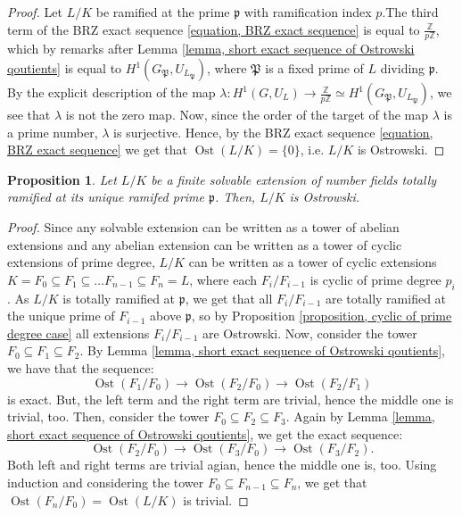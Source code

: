 \documentclass{amsart}
\newtheorem{proposition}[theorem]{Proposition}
\theoremstyle{definition}
\numberwithin{equation}{section}
\DeclareMathOperator{\Ost}{Ost}
\begin{document}
\begin{proof}
Let $L/K$ be ramified at the prime $\mathfrak{p}$ with ramification index $p$.The third term of the BRZ exact sequence \eqref{equation, BRZ exact sequence} is 
equal to $\frac{\mathbb{Z}}{p\mathbb{Z}}$, which by remarks after Lemma \ref{lemma, short exact sequence of Ostrowski qoutients} is equal to $ H^1(G_{\mathfrak{P}},U_{L_{\mathfrak{P}}})$, where $\mathfrak{P}$ is a fixed prime of $L$ dividing $\mathfrak{p}$. By the explicit description of the map $\lambda: H^1(G,U_L) \rightarrow \frac{\mathbb{Z}}{p\mathbb{Z}} \simeq  H^1(G_{\mathfrak{P}},U_{L_{\mathfrak{P}}})$, we see that $\lambda$ is not the zero map. Now, since the order of the target of the map $\lambda$ is a prime number, $\lambda$ is surjective. Hence, by the BRZ exact sequence \eqref{equation, BRZ exact sequence} we get that $\Ost(L/K)=\{0\}$, i.e. $L/K$ is Ostrowski.
\end{proof}

\begin{proposition} \label{proposition, totally ramified case}
Let $L/K$ be a finite solvable extension of number fields totally ramified at its unique ramifed prime $\mathfrak{p}$. Then, $L/K$ is Ostrowski.
\end{proposition}

\begin{proof}
Since any solvable extension can be written as a tower of abelian extensions and any abelian extension can be written as a tower of cyclic extensions of prime degree, $L/K$ can be written as a tower of cyclic extensions $K=F_0 \subseteq F_1 \subseteq \dots F_{n-1} \subseteq F_n=L$, where each $F_i/F_{i-1}$ is cyclic of prime degree $p_i$. As $L/K$ is totally ramified at $\mathfrak{p}$, we get that all $F_i/F_{i-1}$ are totally ramified at the unique prime of $F_{i-1}$ above $\mathfrak{p}$, so by Proposition \ref{proposition, cyclic of prime degree case} all extensions $F_i/F_{i-1}$ are Ostrowski. Now, consider the tower $F_0 \subseteq F_1 \subseteq F_2$. By Lemma \ref{lemma, short exact sequence of Ostrowski qoutients}, we have that the sequence:
\begin{equation*}
\Ost(F_1/F_0) \rightarrow \Ost(F_2/F_0) \rightarrow \Ost(F_2/F_1)
\end{equation*}
is exact. But, the left term and the right term are trivial, hence the middle one is trivial, too. Then, consider the tower $F_0 \subseteq F_2 \subseteq F_3$. Again by Lemma \ref{lemma, short exact sequence of Ostrowski qoutients}, we get the exact sequence:
\begin{equation*}
\Ost(F_2/F_0) \rightarrow \Ost(F_3/F_0) \rightarrow \Ost(F_3/F_2).
\end{equation*}
Both left and right terms are trivial agian, hence the middle one is, too. Using induction and considering the tower $F_0 \subseteq F_{n-1} \subseteq F_n$, we get that $\Ost(F_n/F_0)=\Ost(L/K)$ is trivial.
\end{proof}
\end{document}
